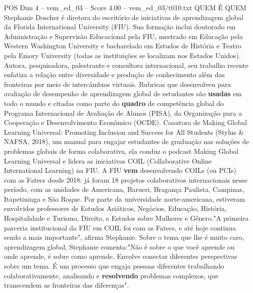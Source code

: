 \begin{textsample}{POS Dim 4 – vem\_ed\_03 – Score 4.00 – vem\_ed\_03/t010.txt}  \label{ex:f4_pos_050}
QUEM É QUEM Stephanie Doscher é diretora do escritório de iniciativas de aprendizagem global da Florida International University (FIU).
Sua formação inclui doutorado em Administração e Supervisão Educacional pela FIU, mestrado em Educação pela Western Washington University e bacharelado em Estudos de História e Teatro pela Emory University (todas as instituições se localizam nos Estados Unidos).
Autora, pesquisadora, palestrante e consultora internacional, seu trabalho recente enfatiza a relação entre diversidade e produção de conhecimento além das fronteiras por meio de intercâmbios virtuais.
Rubricas que desenvolveu para avaliação de desempenho de aprendizagem global de estudantes são \textbf{usadas} em todo o mundo e citadas como parte do \textbf{quadro} de competência global do Programa Internacional de Avaliação de Alunos (PISA), da Organização para a Cooperação e Desenvolvimento Econômico (OCDE).
Coautora de Making Global Learning Universal: Promoting Inclusion and Success for All Students (Stylus \& NAFSA, 2018), um manual para engajar estudantes de graduação nas soluções de problemas globais de forma colaborativa, ela conduz o podcast Making Global Learning Universal e lidera as iniciativas COIL (Collaborative Online International Learning) na FIU.
A FIU \textbf{vem} desenvolvendo COILs (ou PCIs) com as Fatecs desde 2018: já foram 18 projetos colaborativos internacionais nesse período, com as unidades de Americana, Barueri, Bragança Paulista, Campinas, Itapetininga e São Roque.
Por parte da universidade norte-americana, estiveram envolvidos professores de Estudos Asiáticos, Negócios, Educação, História, Hospitalidade e Turismo, Direito, e Estudos sobre Mulheres e Gênero."A primeira parceria institucional da FIU em COIL foi com as Fatecs, e até hoje continua sendo a mais importante", afirma Stephanie.
Sobre o tema que lhe é muito caro, aprendizagem global, Stephanie comenta:"Não é sobre o que você aprende ou onde aprende, é sobre como aprende.
Envolve conectar diferentes perspectivas sobre um tema.
É um processo que engaja pessoas diferentes trabalhando colaborativamente, analisando e \textbf{resolvendo} problemas complexos, que transcendem as fronteiras das diferenças".

\end{textsample}
